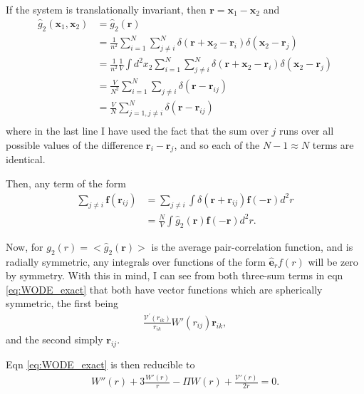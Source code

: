 \documentclass[twocolumn,amsmath,amssymb,aps]{revtex4-1}%
\begin{document}
If the system is translationally invariant, then $\bm{r}=\bm{x}_1-\bm{x}_2$
and
\begin{align}
  \hat{g}_2(\bm{x}_1,\bm{x}_2)
  &=\hat{g}_2(\bm{r})\nonumber\\
  &=\frac{1}{n^2}\sum_{i=1}^N\sum_{j\neq i}^N\delta(\bm{r}+\bm{x}_2-\bm{r}_i)
  \delta(\bm{x}_2-\bm{r}_j)\nonumber\\
  &=\frac{1}{n^2}\frac{1}{V}\int d^2x_2 \sum_{i=1}^N\sum_{j\neq i}^N
  \delta(\bm{r}+\bm{x}_2-\bm{r}_i)\delta(\bm{x}_2-\bm{r}_j)\nonumber\\
  &=\frac{V}{N^2}\sum_{i=1}^N\sum_{j\neq i}
  \delta(\bm{r}-\bm{r}_{ij})\nonumber\\
  &=\frac{V}{N}\sum_{j=1,j\neq i}^N\delta(\bm{r}-\bm{r}_{ij})\nonumber\\
\end{align}
where in the last line I have used the fact that the sum over $j$ runs over
all possible values of the difference $\bm{r}_i-\bm{r}_j$, and so each of the
$N-1\approx N$ terms are identical.

Then, any term of the form
\begin{align}
  \sum_{j\neq i} \bm{f}(\bm{r}_{ij})
  &= \sum_{j\neq i}\int \delta(\bm{r}+\bm{r}_{ij})\bm{f}(-\bm{r})
  d^2r\nonumber\\
  &=\frac{N}{V}\int\hat{g}_2(\bm{r})\bm{f}(-\bm{r})d^2r.
\end{align}

Now, for $g_2(r)=<\hat{g}_2(\bm{r})>$ is the average pair-correlation function,
and is radially symmetric, any integrals over functions of the form
$\bm{\hat{e}}_r f(r)$ will be zero by symmetry. With this in mind, I can see
from both three-sum terms in eqn \ref{eq:WODE_exact} that both have vector
functions which are spherically symmetric, the first being 
\begin{align}
  \frac{\mathcal{V}^{\prime}(r_{ik})}{r_{ik}}W'(r_{ij})\bm{r}_{ik},
\end{align}
and the second simply $\bm{r}_{ij}$. 

Eqn \ref{eq:WODE_exact} is then reducible to
\begin{align}\label{eq:WODE_isotropic}
  W''(r)+3\frac{W'(r)}{r}-\Pi W(r)+\frac{\mathcal{V}'(r)}{2r}=0.
\end{align}
\end{document}
